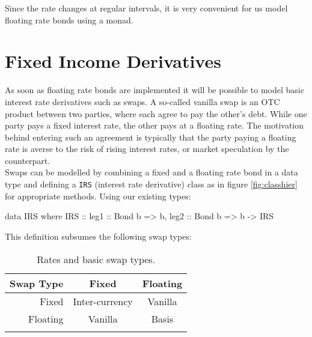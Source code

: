 
Since the rate changes at regular intervals, it is very convenient for us
model floating rate bonds using a monad. 

\section{Fixed Income Derivatives}

As soon as floating rate bonds are implemented it will be possible to model
basic interest rate derivatives such as swaps. A so-called vanilla swap is an
OTC product between two parties, where each agree to pay the other's debt. While
one party pays a fixed interest rate, the other pays at a floating rate. The
motivation behind entering such an agreement is typically that the party paying
a floating rate is averse to the risk of rising interest rates, or market
speculation by the counterpart.\\

Swaps can be modelled by combining a fixed and a floating rate bond in a data
type and defining a \texttt{IRS} (interest rate derivative) class as in figure
\ref{fig:classhier} for appropriate methods.
Using our existing types:

\begin{hscode}
data IRS where
    IRS :: { leg1 :: Bond b => b,
             leg2 :: Bond b => b } -> IRS
\end{hscode}

This definition subsumes the following swap types:

\begin{center}  
\begin{longtable}{r|c|c|}
Swap Type & Fixed          & Floating \\\hline  
Fixed     & Inter-currency & Vanilla\\\hline
Floating  & Vanilla        & Basis\\\hline
\caption{Rates and basic swap types.}
\end{longtable}
\label{tab:swaps}
\end{center}

